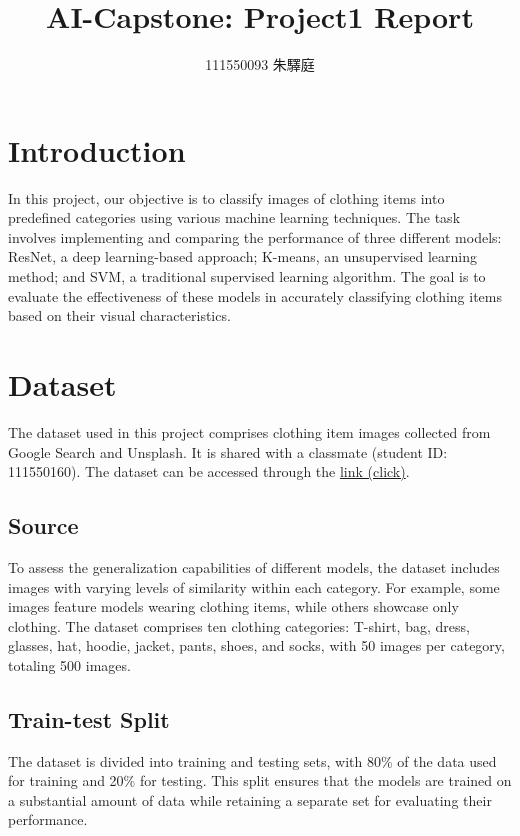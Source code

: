 \documentclass[12pt]{article}
\begin{document}
\title{AI-Capstone: Project1 Report}
\author{111550093 朱驛庭}
\maketitle


\section{Introduction}
In this project, our objective is to classify images of clothing items into predefined categories using various machine learning techniques. The task involves implementing and comparing the performance of three different models: ResNet, a deep learning-based approach; K-means, an unsupervised learning method; and SVM, a traditional supervised learning algorithm. The goal is to evaluate the effectiveness of these models in accurately classifying clothing items based on their visual characteristics.

\section{Dataset}  
The dataset used in this project comprises clothing item images collected from Google Search and Unsplash. It is shared with a classmate (student ID: 111550160). The dataset can be accessed through the \href{https://github.com/ChuEating1005/AI-Capstone/tree/main/Project1/images}{link (click)}.

    \subsection{Source}
    To assess the generalization capabilities of different models, the dataset includes images with varying levels of similarity within each category. For example, some images feature models wearing clothing items, while others showcase only clothing. The dataset comprises ten clothing categories: T-shirt, bag, dress, glasses, hat, hoodie, jacket, pants, shoes, and socks, with 50 images per category, totaling 500 images.
    
    \subsection{Train-test Split}
    The dataset is divided into training and testing sets, with 80\% of the data used for training and 20\% for testing. This split ensures that the models are trained on a substantial amount of data while retaining a separate set for evaluating their performance.
\end{document}
